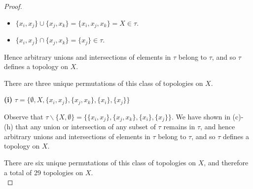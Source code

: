 \begin{proof}
        \begin{itemize}
            \item $\{x_i, x_j\} \cup \{x_j, x_k\} = \{x_i, x_j, x_k\} = X \in \tau$.
            \item $\{x_i, x_j\} \cap \{x_j, x_k\} = \{x_j\} \in \tau$.
        \end{itemize}
        Hence arbitrary unions and intersections of elements in $\tau$ belong to $\tau$, and so $\tau$ defines a 
        topology on $X$.
        
        There are three unique permutations of this class of topologies on $X$.
    
    \textbf{(i)} $\tau = \{\emptyset, X, \{x_i, x_j\}, \{x_j, x_k\}, \{x_i\}, \{x_j\}\}$
        
        Observe that $\tau \backslash \{X, \emptyset\} = \{\{x_i, x_j\}, \{x_j, x_k\}, \{x_i\}, \{x_j\} \}$.
        We have shown in (c)-(h) that any union or intersection of any subset of $\tau$ remains in $\tau$, and hence 
        arbitrary unions and intersections of elements in $\tau$ belong to $\tau$, and so $\tau$ defines a topology on 
        $X$.
        
        There are six unique permutations of this class of topologies on $X$, and therefore a total of 29 topologies on
        $X$.
        \ \\
\end{proof}
